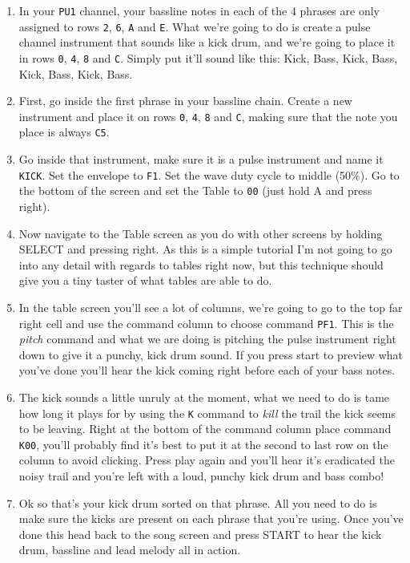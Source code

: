 \documentclass[]{article}
\newcommand{\buttonStyle}[1]{\textsf{#1}\xspace}
\newcommand{\bA}{\buttonStyle{A}}
\newcommand{\bStart}{\buttonStyle{{START}}}
\newcommand{\bSelect}{\buttonStyle{{SELECT}}}
\newcommand{\bRight}{\buttonStyle{right}}
\newcommand{\gbtxt}[1]{\texttt{#1}\xspace}
\begin{document}
\begin{enumerate}

\item  In your \gbtxt{PU1} channel, your bassline notes in each of the 4 phrases are only assigned to rows \gbtxt{2}, \gbtxt{6}, \gbtxt{A} and \gbtxt{E}. What we're going to do is create a pulse channel instrument that sounds like a kick drum, and we're going to place it in rows \gbtxt{0}, \gbtxt{4}, \gbtxt{8} and \gbtxt{C}. Simply put it'll sound like this: Kick, Bass, Kick, Bass, Kick, Bass, Kick, Bass.

\item First, go inside the first phrase in your bassline chain. Create a new instrument and place it on rows \gbtxt{0}, \gbtxt{4}, \gbtxt{8} and \gbtxt{C}, making sure that the note you place is always \gbtxt{C5}.

\item Go inside that instrument, make sure it is a pulse instrument and name it \gbtxt{KICK}. Set the envelope to \gbtxt{F1}. Set the wave duty cycle to middle (50\%). Go to the bottom of the screen and set the Table to \gbtxt{00} (just hold \bA and press \bRight).

\item Now navigate to the Table screen as you do with other screens by holding \bSelect and pressing \bRight. As this is a simple tutorial I'm not going to go into any detail with regards to tables right now, but this technique should give you a tiny taster of what tables are able to do.

\item In the table screen you'll see a lot of columns, we're going to go to the top far right cell and use the command column to choose command \gbtxt{PF1}. This is the \textit{pitch} command and what we are doing is pitching the pulse instrument right down to give it a punchy, kick drum sound. If you press start to preview what you've done you'll hear the kick coming right before each of your bass notes.

\item The kick sounds a little unruly at the moment, what we need to do is tame how long it plays for by using the \gbtxt{K} command to \textit{kill} the trail the kick seems to be leaving. Right at the bottom of the command column place command \gbtxt{K00}, you'll probably find it's best to put it at the second to last row on the column to avoid clicking. Press play again and you'll hear it's eradicated the noisy trail and you're left with a loud, punchy kick drum and bass combo!

\item Ok so that's your kick drum sorted on that phrase. All you need to do is make sure the kicks are present on each phrase that you're using. Once you've done this head back to the song screen and press \bStart to hear the kick drum, bassline and lead melody all in action.

\end{enumerate}
\end{document}
